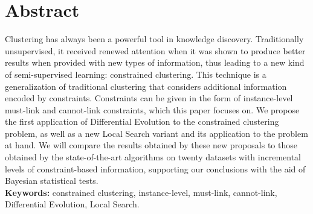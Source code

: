 \begingroup

\chapter*{Abstract}

Clustering has always been a powerful tool in knowledge discovery. Traditionally unsupervised, it received renewed attention when it was shown to produce better results when provided with new types of information, thus leading to a new kind of semi-supervised learning: constrained clustering. This technique is a generalization of traditional clustering that considers additional information encoded by constraints. Constraints can be given in the form of instance-level must-link and cannot-link constraints, which this paper focuses on. We propose the first application of Differential Evolution to the constrained clustering problem, as well as a new Local Search variant and its application to the problem at hand. We will compare the results obtained by these new proposals to those obtained by the state-of-the-art algorithms on twenty datasets with incremental levels of constraint-based information, supporting our conclusions with the aid of Bayesian statistical tests.\\ 


\noindent\textbf{Keywords:} constrained clustering, instance-level, must-link, cannot-link, Differential Evolution, Local Search.


\endgroup
